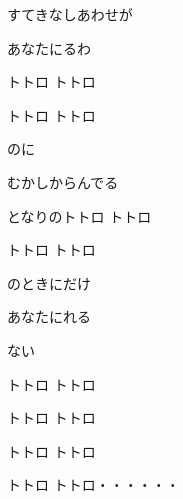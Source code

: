 \documentclass[14pt]{extreport}
\begin{document}
{  すてきなしあわせが
  \jisho{}

  あなたにるわ
  \jisho{}

  トトロ トトロ
  \jisho{}

  トトロ トトロ
  \jisho{}

  のに
  \jisho{}

  むかしからんでる
  \jisho{}

  となりのトトロ トトロ
  \jisho{}

  トトロ トトロ
  \jisho{}

  のときにだけ
  \jisho{}

  あなたにれる
  \jisho{}

  ない
  \jisho{}

  トトロ トトロ
  \jisho{}

  トトロ トトロ
  \jisho{}

  トトロ トトロ
  \jisho{}

  トトロ トトロ・・・・・・
  \jisho{}

}
\end{document}
